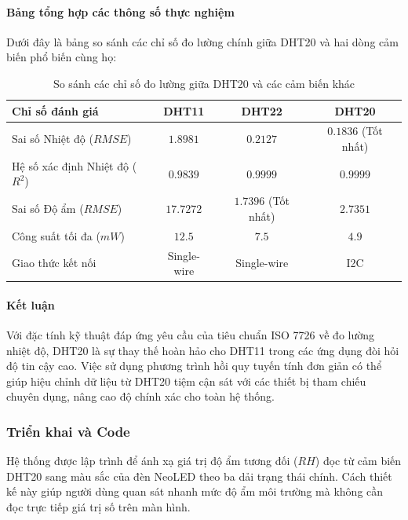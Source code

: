 \paragraph{Bảng tổng hợp các thông số thực nghiệm}

Dưới đây là bảng so sánh các chỉ số đo lường chính giữa DHT20 và hai dòng cảm biến phổ biến cùng họ:

\begin{table}[h]
    \centering
    \begin{tabular}{|l|c|c|c|}
        \hline
        \textbf{Chỉ số đánh giá} & \textbf{DHT11} & \textbf{DHT22} & \textbf{DHT20} \\
        \hline
        Sai số Nhiệt độ ($RMSE$) & $1.8981$ & $0.2127$ & $0.1836$ (Tốt nhất) \\
        \hline
        Hệ số xác định Nhiệt độ ($R^2$) & $0.9839$ & $0.9999$ & $0.9999$ \\
        \hline
        Sai số Độ ẩm ($RMSE$) & $17.7272$ & $1.7396$ (Tốt nhất) & $2.7351$ \\
        \hline
        Công suất tối đa ($mW$) & $12.5$ & $7.5$ & $4.9$ \\
        \hline
        Giao thức kết nối & Single-wire & Single-wire & I2C \\
        \hline
    \end{tabular}
    \caption{So sánh các chỉ số đo lường giữa DHT20 và các cảm biến khác}
    \label{tab:dht_comparison}
\end{table}

\paragraph{Kết luận}

Với đặc tính kỹ thuật đáp ứng yêu cầu của tiêu chuẩn ISO 7726 về đo lường nhiệt độ, DHT20 là sự thay thế hoàn hảo cho DHT11 trong các ứng dụng đòi hỏi độ tin cậy cao. Việc sử dụng phương trình hồi quy tuyến tính đơn giản có thể giúp hiệu chỉnh dữ liệu từ DHT20 tiệm cận sát với các thiết bị tham chiếu chuyên dụng, nâng cao độ chính xác cho toàn hệ thống.

\subsubsection{Triển khai và Code}

Hệ thống được lập trình để ánh xạ giá trị độ ẩm tương đối ($RH$) đọc từ cảm biến DHT20 sang màu sắc của đèn NeoLED theo ba dải trạng thái chính. Cách thiết kế này giúp người dùng quan sát nhanh mức độ ẩm môi trường mà không cần đọc trực tiếp giá trị số trên màn hình.

